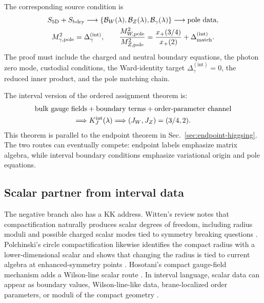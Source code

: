 \begin{widetext}
The corresponding source condition is
\begin{equation}
\begin{gathered}
  S_{\rm 5D}+S_{\rm bdry}
  \longrightarrow
  \{
  \mathcal B_W(\lambda),
  \mathcal B_Z(\lambda),
  \mathcal B_\gamma(\lambda)
  \}
  \longrightarrow
  \hbox{pole data},
  \\
  M_{\gamma,\rm pole}^2=\Delta_\gamma^{(\mathrm{int})},\qquad
  \frac{M_{W,\rm pole}^2}{M_{Z,\rm pole}^2}
  =
  \frac{x_+(3/4)}{x_+(2)}
  +\Delta^{(\mathrm{int})}_{\rm match}.
\end{gathered}
  \label{eq:interval-ew-boundary-proof}
\end{equation}
The proof must include the charged and neutral boundary equations, the photon
zero mode, custodial conditions, the Ward-identity target
\(\Delta_\gamma^{(\mathrm{int})}=0\), the reduced inner product, and the pole
matching chain.

The interval version of the ordered assignment theorem is:
\begin{equation}
\begin{gathered}
  \text{bulk gauge fields}
  +\text{boundary terms}
  +\text{order-parameter channel}
  \\
  \Longrightarrow
  K_J^{\rm int}(\lambda)
  \Longrightarrow
  (J_W,J_Z)=(3/4,2).
\end{gathered}
\label{eq:interval-assignment-theorem}
\end{equation}
This theorem is parallel to the endpoint theorem in Sec.~\ref{sec:endpoint-higgsing}.  The two routes can eventually compete: endpoint labels emphasize matrix algebra, while interval boundary conditions emphasize variational origin and pole equations.
\end{widetext}

\subsection{Scalar partner from interval data}
\label{sec:kk-scalar-partner}

The negative branch also has a KK address.  Witten's review notes that compactification naturally produces scalar degrees of freedom, including radius moduli and possible charged scalar modes tied to symmetry breaking questions \cite{WittenKK1981}.  Polchinski's circle compactification likewise identifies the compact radius with a lower-dimensional scalar and shows that changing the radius is tied to current algebra at enhanced-symmetry points \cite{Polchinski1994}.  Hosotani's compact gauge-field mechanism adds a Wilson-line scalar route \cite{Hosotani1983}.  In interval language, scalar data can appear as boundary values, Wilson-line-like data, brane-localized order parameters, or moduli of the compact geometry \cite{Bucci2004,HabaOda2011}.

